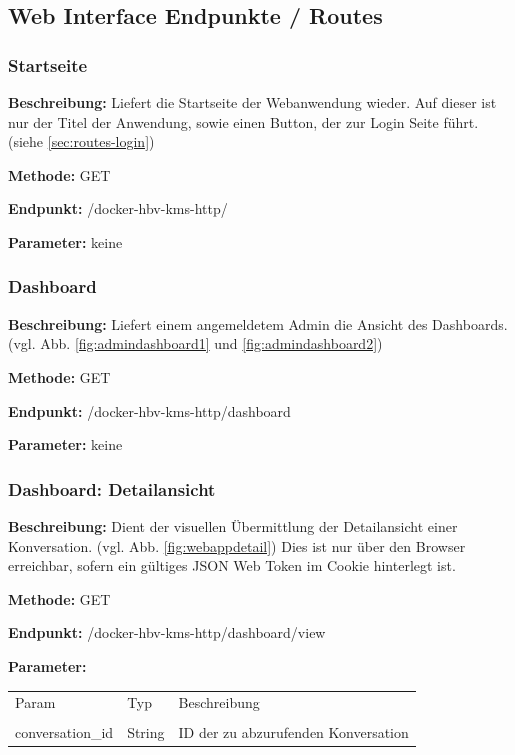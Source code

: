 \subsection{Web Interface Endpunkte / Routes}
\label{sec:routes}
\dotfill
\subsubsection{Startseite}
\label{sec:routes-start}
\textbf{Beschreibung:} Liefert die Startseite der Webanwendung wieder. Auf dieser ist nur der Titel der Anwendung,
sowie einen Button, der zur Login Seite führt. (siehe \ref{sec:routes-login})

\textbf{Methode:} GET

\textbf{Endpunkt:} /docker-hbv-kms-http/

\textbf{Parameter:}
keine

\dotfill

\subsubsection{Dashboard}
\label{sec:routes-dashboard}
\textbf{Beschreibung:} Liefert einem angemeldetem Admin die Ansicht des Dashboards.
(vgl. Abb. \ref{fig:admindashboard1} und \ref{fig:admindashboard2})

\textbf{Methode:} GET

\textbf{Endpunkt:} /docker-hbv-kms-http/dashboard

\textbf{Parameter:}
keine

\dotfill

\subsubsection{Dashboard: Detailansicht}
\label{sec:routes-dashboard-detail}
\textbf{Beschreibung:} Dient der visuellen Übermittlung der Detailansicht einer Konversation. (vgl. Abb. \ref{fig:webappdetail})
Dies ist nur über den Browser erreichbar, sofern ein gültiges JSON Web Token im Cookie hinterlegt ist.

\textbf{Methode:} GET

\textbf{Endpunkt:} /docker-hbv-kms-http/dashboard/view

\textbf{Parameter:}
\begin{table}[H]
    \label{table:/docker-hbv-kms-http/dashboard/view}
    \setlength{\tabcolsep}{3pt}
    \begin{tabular}{p{100pt}p{80pt}p{200pt}}
        \hline
        Param            & Typ    & Beschreibung                        \\                                                             \\
        \hline
        conversation\_id & String & ID der zu abzurufenden Konversation \\
        \hline
    \end{tabular}
\end{table}
\dotfill

